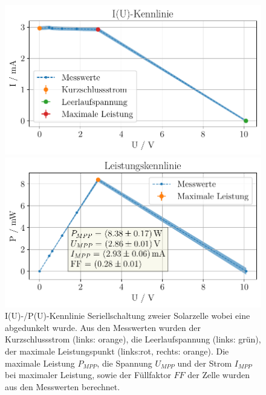 \documentclass[english, ngerman]{scrartcl}
\begin{document}
\setcaphanging

\setcapindent{0pt}
\begin{figure}[H]
    \centering
    \begin{minipage}[t]{0.485\linewidth}
        \centering
        \includegraphics[width=\linewidth]{fig/plots/solar_solar_verdeckt_UI_.pdf}
    \end{minipage}%
    \hspace*{\fill}
    \begin{minipage}[t]{0.485\linewidth}
        \centering
        \includegraphics[width=\linewidth]{fig/plots/solar_solar_verdeckt_UP_.pdf}
    \end{minipage}
    \caption[I(U)-/P(U)-Kennlinie Seriellschaltung -- abgedunkelt Solarzelle]{I(U)-/P(U)-Kennlinie Seriellschaltung zweier Solarzelle wobei eine abgedunkelt wurde. Aus den Messwerten wurden der Kurzschlussstrom (links: orange), die Leerlaufspannung (links: grün), der maximale Leistungspunkt (links:rot, rechts: orange). Die maximale Leistung $P_{MPP}$, die Spannung $U_{MPP}$ und der Strom $I_{MPP}$ bei maximaler Leistung, sowie der Füllfaktor $FF$ der Zelle wurden aus den Messwerten berechnet.}
    \label{fig:solar_verdeckt}
\end{figure}
\setcaphanging
\end{document}
